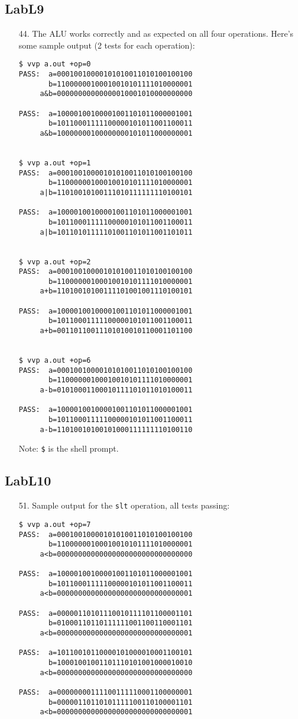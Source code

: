\documentclass{article}
\begin{document}
\subsection{LabL9}
\begin{enumerate}
\item[44. ] The ALU works correctly and as expected on all four operations. Here's some sample output (2 tests for each operation):
\begin{verbatim}
$ vvp a.out +op=0
PASS:  a=00010010000101010011010100100100
       b=11000000100010010101111010000001
     a&b=00000000000000010001010000000000

PASS:  a=10000100100001001101011000001001
       b=10110001111100000101011001100011
     a&b=10000000100000000101011000000001


$ vvp a.out +op=1
PASS:  a=00010010000101010011010100100100
       b=11000000100010010101111010000001
     a|b=11010010100111010111111110100101

PASS:  a=10000100100001001101011000001001
       b=10110001111100000101011001100011
     a|b=10110101111101001101011001101011


$ vvp a.out +op=2
PASS:  a=00010010000101010011010100100100
       b=11000000100010010101111010000001
     a+b=11010010100111101001001110100101

PASS:  a=10000100100001001101011000001001
       b=10110001111100000101011001100011
     a+b=00110110011101010010110001101100


$ vvp a.out +op=6
PASS:  a=00010010000101010011010100100100
       b=11000000100010010101111010000001
     a-b=01010001100010111101011010100011

PASS:  a=10000100100001001101011000001001
       b=10110001111100000101011001100011
     a-b=11010010100101000111111110100110
\end{verbatim}
  Note: \verb#$# is the shell prompt.
\end{enumerate}

\subsection{LabL10}
\begin{enumerate}
\item[51. ] Sample output for the \verb$slt$ operation, all tests passing:
\begin{verbatim}
$ vvp a.out +op=7
PASS:  a=00010010000101010011010100100100
       b=11000000100010010101111010000001
     a<b=00000000000000000000000000000000

PASS:  a=10000100100001001101011000001001
       b=10110001111100000101011001100011
     a<b=00000000000000000000000000000001

PASS:  a=00000110101110010111101100001101
       b=01000110110111111001100110001101
     a<b=00000000000000000000000000000001

PASS:  a=10110010110000101000010001100101
       b=10001001001101110101001000010010
     a<b=00000000000000000000000000000000

PASS:  a=00000000111100111110001100000001
       b=00000110110101111100110100001101
     a<b=00000000000000000000000000000001
\end{verbatim}
\end{enumerate}
\end{document}
